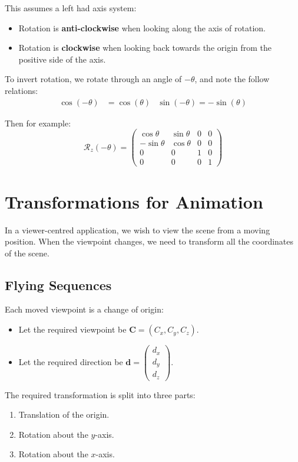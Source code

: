 \documentclass[11pt]{article}
\begin{document}
This assumes a left had axis system:
\begin{itemize}
  \item Rotation is \textbf{anti-clockwise} when looking along the axis of rotation.
  \item Rotation is \textbf{clockwise} when looking back towards the origin from the positive side of the axis.
\end{itemize}

To invert rotation, we rotate through an angle of $- \theta$, and note the follow relations:
\begin{align*}
  \cos(-\theta) &= \cos(\theta) & \sin(-\theta)=-\sin(\theta)
\end{align*}

Then for example:
\[
  \mathcal{R}_z(-\theta) = 
  \begin{pmatrix}
    \cos \theta & \sin \theta & 0 & 0 \\
    - \sin \theta & \cos \theta & 0 & 0 \\
    0 & 0 & 1 & 0 \\
    0 & 0 & 0 & 1
  \end{pmatrix}
\]

\section{Transformations for Animation}
In a viewer-centred application, we wish to view the scene from a moving position.
When the viewpoint changes, we need to transform all the coordinates of the scene.

\subsection{Flying Sequences}
Each moved viewpoint is a change of origin:
\begin{itemize}
  \item Let the required viewpoint be $\bm{C} = (C_x, C_y, C_z)$.
  \item Let the required direction be $\bm{d} = \begin{pmatrix} d_x \\ d_y \\ d_z \end{pmatrix}$.
\end{itemize}

The required transformation is split into three parts:
\begin{enumerate}
  \item Translation of the origin.
  \item Rotation about the $y$-axis.
  \item Rotation about the $x$-axis.
\end{enumerate}
\end{document}

